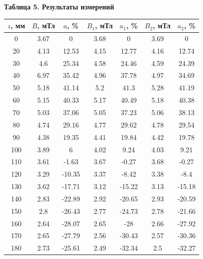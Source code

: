 \documentclass[a4paper,14pt]{extarticle}
\begin{document}
\begin{center}
\small
\textbf{Таблица 5. Результаты измерений}
\begin{tabular}{|c|c|c|c|c|c|c|}
\hline
$z$, мм & $B$, мТл & $a$, \% & $B_1$, мТл & $a_1$, \% & $B_2$, мТл & $a_2$, \% \\ \hline
0 & 3.67 & 0 & 3.68 & 0 & 3.69 & 0\\ \hline
20 & 4.13 & 12.53 & 4.15 & 12.77 & 4.16 & 12.74 \\ \hline
30 & 4.6 & 25.34 & 4.58 & 24.46 & 4.59 & 24.39 \\ \hline
40 & 6.97 & 35.42 & 4.96 & 37.78 & 4.97 & 34.69 \\ \hline
50 & 5.18 & 41.14 & 5.2 & 41.3 & 5.28 & 41.19 \\ \hline
60 & 5.15 & 40.33 & 5.17 & 40.49 & 5.18 & 40.38 \\ \hline
70 & 5.03 & 37.06 & 5.05 & 37.23 & 5.06 & 38.13 \\ \hline
80 & 4.74 & 29.16 & 4.77 & 29.62 & 4.78 & 29.54 \\ \hline
90 & 4.38 & 19.35 & 4.41 & 19.84 & 4.42 & 19.78 \\ \hline
100 & 3.89 & 6 & 4.02 & 9.24 & 4.03 & 9.21 \\ \hline
110 & 3.61 & -1.63 & 3.67 & -0.27 & 3.68 & -0.27 \\ \hline
120 & 3.29 & -10.35 & 3.37 & -8.42 & 3.38 & -8.4 \\ \hline
130 & 3.62 & -17.71 & 3.12 & -15.22 & 3.13 & -15.18 \\ \hline
140 & 2.83 & -22.89 & 2.92 & -20.65 & 2.93 & -20.59 \\ \hline
150 & 2.8 & -26.43 & 2.77 & -24.73 & 2.78 & -21.66 \\ \hline
160 & 2.64 & -28.07 & 2.65 & -28 & 2.66 & -27.92 \\ \hline
170 & 2.65 & -27.79 & 2.56 & -30.43 & 2.57 & -30.36 \\ \hline
180 & 2.73 & -25.61 & 2.49 & -32.34 & 2.5 & -32.27 \\ \hline
\end{tabular}
\end{center}
\end{document}
